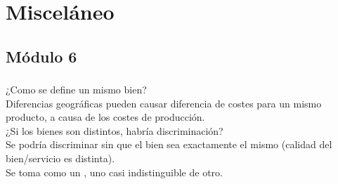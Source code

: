 \section{Misceláneo}

\subsection{Módulo 6}

\subsubsection{}
\label{misc:mismo_precio}
¿Como se define un mismo bien?\\

Diferencias geográficas pueden causar diferencia de costes para un mismo producto, a causa de los costes de producción.\\


¿Si los bienes son distintos, habría discriminación?\\

Se podría discriminar sin que el bien sea exactamente el mismo (calidad del bien/servicio es distinta).\\


Se toma como un , uno casi indistinguible de otro.

\newpage